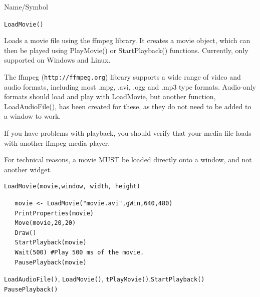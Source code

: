 \begin{desc}{Name/Symbol}
\item[Name/Symbol]	\verb+LoadMovie()+
 
\item[Description] Loads a movie file using the ffmpeg library.  It creates a movie
object, which can then be played using PlayMovie() or StartPlayback() functions.  Currently,
only supported on Windows and Linux.

The ffmpeg (\verb+http://ffmpeg.org+) library supports a wide range of video and audio formats,
including most .mpg, .avi, .ogg and .mp3 type formats.  Audio-only formats should load
and play with LoadMovie, but another function, LoadAudioFile(), has been created for these,
as they do not need to be added to a window to work.

If you have problems with playback, 
you should verify that your media file loads with another ffmpeg media player.

For technical reasons, a movie MUST be loaded directly onto a window, and not another widget.

\item[Usage]		
\begin{verbatim}
LoadMovie(movie,window, width, height)
\end{verbatim}

\item[Example]	
\begin{verbatim}
   movie <- LoadMovie("movie.avi",gWin,640,480)
   PrintProperties(movie)
   Move(movie,20,20)
   Draw() 
   StartPlayback(movie)
   Wait(500) #Play 500 ms of the movie.
   PausePlayback(movie)
\end{verbatim}

\item[See Also] \verb+LoadAudioFile()+, \verb+LoadMovie()+, \verb+tPlayMovie()+,\verb+StartPlayback()+ \verb+PausePlayback()+
\end{desc}

